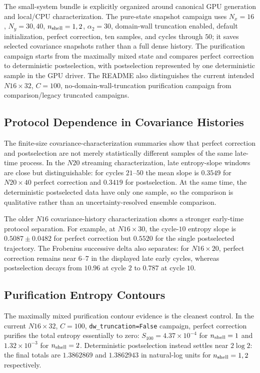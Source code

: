 \documentclass[aps,prb,onecolumn,nofootinbib,superscriptaddress]{revtex4-2}
\begin{document}
The small-system bundle is explicitly organized around canonical GPU generation
and local/CPU characterization.  The pure-state snapshot campaign uses
$N_x=16$, $N_y=30,40$, $n_{\rm shell}=1,2$, $\alpha_2=30$,
domain-wall truncation enabled, default initialization, perfect correction,
ten samples, and cycles through $50$; it saves selected covariance snapshots
rather than a full dense history.  The purification campaign starts from the
maximally mixed state and compares perfect correction to deterministic
postselection, with postselection represented by one deterministic sample in the
GPU driver.  The README also distinguishes the current intended
$N16\times 32$, $C=100$, no-domain-wall-truncation purification campaign from
comparison/legacy truncated campaigns.

\subsection{Protocol Dependence in Covariance Histories}

The finite-size covariance-characterization summaries show that perfect
correction and postselection are not merely statistically different samples of
the same late-time process.  In the $N20$ streaming characterization, late
entropy-slope windows are close but distinguishable: for cycles $21$--$50$ the
mean slope is $0.3549$ for $N20\times40$ perfect correction and $0.3419$ for
postselection.  At the same time, the deterministic postselected data have only
one sample, so the comparison is qualitative rather than an uncertainty-resolved
ensemble comparison.

The older $N16$ covariance-history characterization shows a stronger early-time
protocol separation.  For example, at $N16\times30$, the cycle-$10$ entropy
slope is $0.5087\pm0.0482$ for perfect correction but $0.5520$ for the single
postselected trajectory.  The Frobenius successive delta also separates:
for $N16\times20$, perfect correction remains near $6$--$7$ in the displayed
late early cycles, whereas postselection decays from $10.96$ at cycle $2$ to
$0.787$ at cycle $10$.

\subsection{Purification Entropy Contours}

The maximally mixed purification contour evidence is the cleanest control.  In
the current $N16\times32$, $C=100$, \texttt{dw\_truncation=False} campaign,
perfect correction purifies the total entropy essentially to zero:
$S_{100}=4.37\times10^{-4}$ for $n_{\rm shell}=1$ and
$1.32\times10^{-3}$ for $n_{\rm shell}=2$.  Deterministic postselection instead
settles near $2\log 2$: the final totals are $1.3862869$ and $1.3862943$ in
natural-log units for $n_{\rm shell}=1,2$ respectively.
\end{document}
